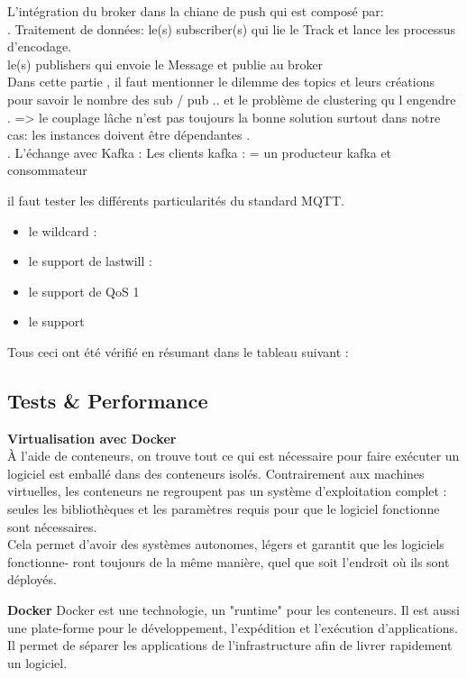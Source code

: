         L'intégration du broker dans la chiane de push qui est composé par:\\
         . Traitement de données:
            le(s) subscriber(s) qui lie le Track et lance les processus d’encodage. \\
            le(s) publishers qui envoie le Message et publie au broker \\
        Dans cette partie , il faut mentionner le dilemme des topics et leurs créations 
        pour savoir le nombre des sub / pub .. et le problème de clustering qu l engendre . 
        => le couplage lâche n’est pas toujours la bonne solution surtout dans notre cas: les instances doivent être dépendantes . \\

        . L’échange avec Kafka : 
            Les clients kafka : = un producteur kafka  et consommateur


        il faut tester les différents particularités du standard MQTT. 
        \begin{itemize}
                \item le wildcard : 
                \item le support de lastwill : 
                \item le support de QoS 1 
                \item le support 
            \end{itemize} 
           
            Tous ceci ont été vérifié en résumant dans le tableau suivant : 

    \subsection{Tests \& Performance}
    \textbf{Virtualisation avec Docker}\\
    À l’aide de conteneurs, on trouve tout ce qui est nécessaire pour faire exécuter un logiciel est emballé
    dans des conteneurs isolés. Contrairement aux machines virtuelles, les conteneurs ne regroupent
    pas un système d’exploitation complet : seules les bibliothèques et les paramètres requis pour
    que le logiciel fonctionne sont nécessaires.\\
    Cela permet d’avoir des systèmes autonomes, légers et garantit que les logiciels fonctionne-
    ront toujours de la même manière, quel que soit l’endroit où ils sont déployés.

    \textbf{Docker}
    Docker est une technologie, un "runtime" pour les conteneurs. Il est aussi une plate-forme
    pour le développement, l’expédition et l’exécution d’applications. Il permet de séparer
    les applications de l’infrastructure afin de livrer rapidement un logiciel. \\

